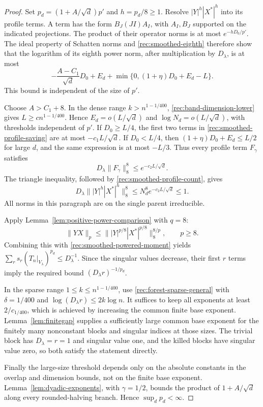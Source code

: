 \begin{proof}
Set $p_d=(1+A/\sqrt d)p'$ and $h=p_d/8\ge1$. Resolve
$|Y|^h|X^*|^h$ into its profile terms. A term has the form
$B_J(JI)A_I$, with $A_I,B_J$ supported on the indicated projections.
The product of their operator norms is at most $e^{-hD_0/p'}$.
The ideal property of Schatten norms and
\eqref{rec:smoothed-eighth} therefore show that the logarithm of
its eighth power norm, after multiplication by $D_\lambda$, is
at most
\begin{equation}\label{rec:smoothed-profile-saving}
 -\frac{A-C_1}{\sqrt d}D_0+E_d
 +\min\{0,(1+\eta)D_0+E_d-L\}.
\end{equation}
This bound is independent of the size of $p'$.

Choose $A>C_1+8$. In the dense range
$k>n^{1-1/400}$, \eqref{rec:band-dimension-lower} gives $L\ge c n^{1-1/400}$. Hence $E_d=o(L/\sqrt d)$ and
$\log N_d=o(L/\sqrt d)$, with thresholds independent of $p'$.
If $D_0\ge L/4$, the first two terms in
\eqref{rec:smoothed-profile-saving} are at most $-c_1L/\sqrt d$.
If $D_0<L/4$, then $(1+\eta)D_0+E_d\le L/2$ for large $d$,
and the same expression is at most $-L/3$.
Thus every profile term $F_\gamma$ satisfies
\[
 D_\lambda\|F_\gamma\|_8^8
 \le e^{-c_2L/\sqrt d}.
\]
The triangle inequality, followed by
\eqref{rec:smoothed-profile-count}, gives
\begin{equation}\label{rec:smoothed-powered-moment}
 D_\lambda\big\||Y|^h|X^*|^h\big\|_8^8
 \le N_d^8e^{-c_2L/\sqrt d}\le1.
\end{equation}
All norms in this paragraph are on the single parent irreducible.

Apply Lemma~\ref{lem:positive-power-comparison} with $q=8$:
\begin{equation}\label{rec:smoothed-power-interpolation}
 \|YX\|_p\le
 \big\||Y|^{p/8}|X^*|^{p/8}\big\|_8^{8/p},\qquad p\ge8.
\end{equation}
Combining this with \eqref{rec:smoothed-powered-moment} yields
$\sum_r s_r(T_n|_{V_\lambda})^{p_d}\le D_\lambda^{-1}$.
Since the singular values decrease, their first $r$ terms imply
the required bound $(D_\lambda r)^{-1/p_d}$.

In the sparse range $1\le k\le n^{1-1/400}$, use
\eqref{rec:forest-sparse-general} with $\delta=1/400$ and
$\log(D_\lambda r)\le2k\log n$. It suffices to keep all exponents
at least $2/c_{1/400}$, which is achieved by increasing the common
finite base exponent. Lemma~\ref{lem:finitegap} supplies a
sufficiently large common base exponent for the finitely many
nonconstant blocks and singular indices at those sizes. The trivial block has $D_\lambda=r=1$
and singular value one, and the killed blocks have singular value
zero, so both satisfy the statement directly.

Finally the large-size threshold depends only on the absolute
constants in the overlap and dimension bounds, not on the finite base
exponent. Lemma~\ref{lem:dyadic-exponents}, with $\gamma=1/2$,
bounds the product of $1+A/\sqrt d$ along every rounded-halving
branch. Hence $\sup_d p_d<\infty$.
\end{proof}

